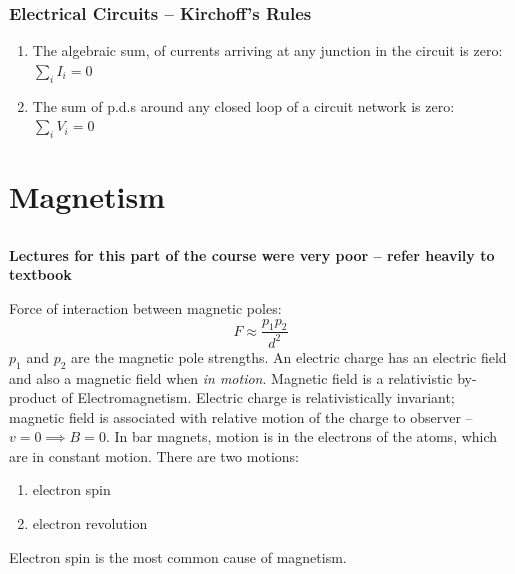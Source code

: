 \documentclass[a4paper, 11pt, normalem]{report}
\begin{document}
\section{Electrical Circuits -- Kirchoff's Rules}
\begin{enumerate}
    \item The algebraic sum, of currents arriving at any junction in the circuit is zero: $\sum_{i} I_{i} = 0$
    \item The sum of p.d.s around any closed loop of a circuit network is zero: $\sum_{i} V_{i} = 0$
\end{enumerate}

\part{Magnetism}
\chapter{}
\textbf{Lectures for this part of the course were very poor -- refer heavily to textbook}

Force of interaction between magnetic poles:
\begin{equation}
    F \approx \frac{p_{1}p_{2}}{d^{2}}
\end{equation}
$p_{1}$ and $p_{2}$ are the magnetic pole strengths.
An electric charge has an electric field and also a magnetic field when \emph{in motion}.
Magnetic field is a relativistic by-product of Electromagnetism.
Electric charge is relativistically invariant; magnetic field is associated with relative motion of the charge to observer -- $v = 0 \implies B = 0$.
In bar magnets, motion is in the electrons of the atoms, which are in constant motion.
There are two motions:
\begin{enumerate}
    \item electron spin
    \item electron revolution
\end{enumerate}
Electron spin is the most common cause of magnetism.
\end{document}
